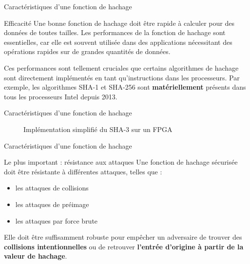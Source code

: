 \begin{frame}{Caractéristiques d'une fonction de hachage}
  \begin{block}{Efficacité}
    Une bonne fonction de hachage doit être rapide à calculer pour des données de toutes tailles.
    Les performances de la fonction de hachage sont essentielles, car elle est souvent utilisée dans des applications nécessitant des opérations rapides sur de grandes quantités de données.

    \vspace*{1em}

    Ces performances sont tellement cruciales que certains algorithmes de hachage sont directement implémentés en tant qu'instructions dans les processeurs.
    Par exemple, les algorithmes SHA-1 et SHA-256 sont \textbf{matériellement} présents dans tous les processeurs Intel depuis 2013.
  \end{block}
\end{frame}

\begin{frame}{Caractéristiques d'une fonction de hachage}
  \begin{figure}

    \caption{Implémentation simplifié du SHA-3 sur un FPGA}
  \end{figure}
\end{frame}

\begin{frame}{Caractéristiques d'une fonction de hachage}
  \begin{block}{Le plus important : résistance aux attaques}
    Une fonction de hachage sécurisée doit être résistante à différentes attaques, telles que :

    \begin{itemize}
      \item les attaques de collisions
      \item les attaques de préimage
      \item les attaques par force brute
    \end{itemize}

    Elle doit être suffisamment robuste pour empêcher un adversaire de trouver des \textbf{collisions intentionnelles} ou de retrouver \textbf{l'entrée d'origine à partir de la valeur de hachage}.
  \end{block}
\end{frame}

